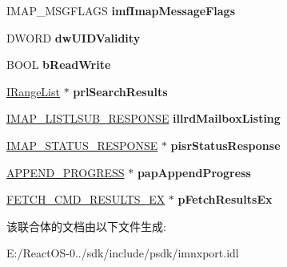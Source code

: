 \begin{DoxyCompactItemize}
I\+M\+A\+P\+\_\+\+M\+S\+G\+F\+L\+A\+GS {\bfseries imf\+Imap\+Message\+Flags}
\item 
\mbox{\label{union_i_i_m_a_p_callback_1_1tag_i_m_a_p___r_e_s_p_o_n_s_e___d_a_t_a_a4b9d3dde269385b90c9aa17f52ed53d8}} 
D\+W\+O\+RD {\bfseries dw\+U\+I\+D\+Validity}
\item 
\mbox{\label{union_i_i_m_a_p_callback_1_1tag_i_m_a_p___r_e_s_p_o_n_s_e___d_a_t_a_a7bd207efc41d66c47035b9ffe5275697}} 
B\+O\+OL {\bfseries b\+Read\+Write}
\item 
\mbox{\label{union_i_i_m_a_p_callback_1_1tag_i_m_a_p___r_e_s_p_o_n_s_e___d_a_t_a_a101a242a41bca714613eb22256b742de}} 
\hyperlink{interface_i_range_list}{I\+Range\+List} $\ast$ {\bfseries prl\+Search\+Results}
\item 
\mbox{\label{union_i_i_m_a_p_callback_1_1tag_i_m_a_p___r_e_s_p_o_n_s_e___d_a_t_a_af5decd2c54691a6f337675d69093bd97}} 
\hyperlink{struct_i_i_m_a_p_callback_1_1tag_i_m_a_p___l_i_s_t_l_s_u_b___r_e_s_p_o_n_s_e}{I\+M\+A\+P\+\_\+\+L\+I\+S\+T\+L\+S\+U\+B\+\_\+\+R\+E\+S\+P\+O\+N\+SE} {\bfseries illrd\+Mailbox\+Listing}
\item 
\mbox{\label{union_i_i_m_a_p_callback_1_1tag_i_m_a_p___r_e_s_p_o_n_s_e___d_a_t_a_a1d798f1607cc0ef3325c31d0e53b98ca}} 
\hyperlink{struct_i_i_m_a_p_callback_1_1tag_i_m_a_p___s_t_a_t_u_s___r_e_s_p_o_n_s_e}{I\+M\+A\+P\+\_\+\+S\+T\+A\+T\+U\+S\+\_\+\+R\+E\+S\+P\+O\+N\+SE} $\ast$ {\bfseries pisr\+Status\+Response}
\item 
\mbox{\label{union_i_i_m_a_p_callback_1_1tag_i_m_a_p___r_e_s_p_o_n_s_e___d_a_t_a_af87ea3d4afea68aabd817e3ffbe0aa00}} 
\hyperlink{struct_i_i_m_a_p_callback_1_1tag_a_p_p_e_n_d___p_r_o_g_r_e_s_s}{A\+P\+P\+E\+N\+D\+\_\+\+P\+R\+O\+G\+R\+E\+SS} $\ast$ {\bfseries pap\+Append\+Progress}
\item 
\mbox{\label{union_i_i_m_a_p_callback_1_1tag_i_m_a_p___r_e_s_p_o_n_s_e___d_a_t_a_a63d37fd15e59dcb186b56259fac8cdf7}} 
\hyperlink{struct_i_i_m_a_p_callback_1_1tag_f_e_t_c_h___c_m_d___r_e_s_u_l_t_s___e_x}{F\+E\+T\+C\+H\+\_\+\+C\+M\+D\+\_\+\+R\+E\+S\+U\+L\+T\+S\+\_\+\+EX} $\ast$ {\bfseries p\+Fetch\+Results\+Ex}
\end{DoxyCompactItemize}


该联合体的文档由以下文件生成\+:\begin{DoxyCompactItemize}
\item 
E\+:/\+React\+O\+S-\/0../sdk/include/psdk/imnxport.\+idl\end{DoxyCompactItemize}
